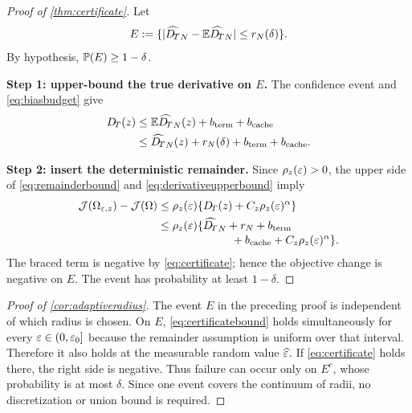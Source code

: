 \begin{proof}[Proof of \cref{thm:certificate}]
Let
\begin{equation}
 E:=\{|\widehat{D_{\!T}}_N-\mathbb{E}\widehat{D_{\!T}}_N|
          \le r_N(\delta)\}.
\end{equation}
By hypothesis, $\mathbb{P}(E)\ge1-\delta$.

\textbf{Step 1: upper-bound the true derivative on $E$.}
The confidence event and \cref{eq:biasbudget} give
\begin{align}
 D_{\!T}(z)
 &\le\mathbb{E}\widehat{D_{\!T}}_N(z)
       +b_{\mathrm{term}}+b_{\mathrm{cache}}\\
 &\le\widehat{D_{\!T}}_N(z)+r_N(\delta)
       +b_{\mathrm{term}}+b_{\mathrm{cache}}.
 \label{eq:derivativeupperbound}
\end{align}

\textbf{Step 2: insert the deterministic remainder.}
Since $\rho_z(\varepsilon)>0$, the upper side of
\cref{eq:remainderbound} and \cref{eq:derivativeupperbound} imply
\begin{align}
 \J(\Omega_{\eps,z})-\J(\Omega)
 &\le\rho_z(\eps)
       \{\DT(z)+C_z\rho_z(\eps)^\alpha\}\\
 &\le\rho_z(\eps)\{
 \widehat{\DT}_N+r_N+b_{\mathrm{term}}\notag\\[-2pt]
 &\hspace{23mm}{}+b_{\mathrm{cache}}
 +C_z\rho_z(\eps)^\alpha\}.
 \label{eq:certificatebound}
\end{align}
The braced term is negative by \cref{eq:certificate}; hence the objective
change is negative on $E$.  The event has probability at least $1-\delta$.
\end{proof}

\begin{proof}[Proof of \cref{cor:adaptiveradius}]
The event $E$ in the preceding proof is independent of which radius is chosen.
On $E$, \cref{eq:certificatebound} holds simultaneously for every
$\varepsilon\in(0,\varepsilon_0]$ because the remainder assumption is uniform over that
interval.  Therefore it also holds at the measurable random value
$\widehat{\varepsilon}$.  If \cref{eq:certificate} holds there, the right side is
negative.  Thus failure can occur only on $E^c$, whose probability is at most
$\delta$.  Since one event covers the continuum of radii, no discretization or
union bound is required.
\end{proof}

